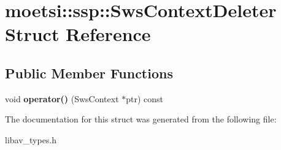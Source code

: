 \hypertarget{structmoetsi_1_1ssp_1_1SwsContextDeleter}{}\section{moetsi\+:\+:ssp\+:\+:Sws\+Context\+Deleter Struct Reference}
\label{structmoetsi_1_1ssp_1_1SwsContextDeleter}
\subsection*{Public Member Functions}
\begin{DoxyCompactItemize}
\item 
\mbox{\label{structmoetsi_1_1ssp_1_1SwsContextDeleter_a00a700e41e3ee79fdcffe1e0308315a6}} 
void {\bfseries operator()} (Sws\+Context $\ast$ptr) const
\end{DoxyCompactItemize}


The documentation for this struct was generated from the following file\+:\begin{DoxyCompactItemize}
\item 
libav\+\_\+types.\+h\end{DoxyCompactItemize}
